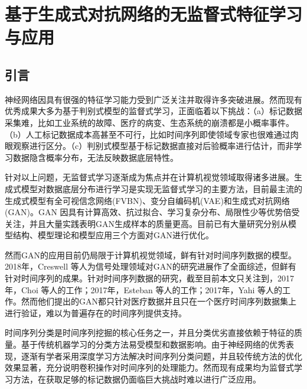 
\chapter{基于生成式对抗网络的无监督式特征学习与应用}
\label{chap:gan}

\section{引言}

神经网络因具有很强的特征学习能力受到广泛关注并取得许多突破进展\cite{lecun2015deep,tsui2015prognostics}。然而现有优秀成果大多为基于判别式模型的监督式学习，正面临着以下挑战：（a）标记数据采集难，比如工业系统的故障、医疗的病变、生态系统的崩溃都是小概率事件。（b）人工标记数据成本高甚至不可行，比如时间序列即使领域专家也很难通过肉眼观察进行区分\cite{langkvist2014review}。（c）判别式模型基于标记数据直接对后验概率进行估计，而非学习数据隐含概率分布，无法反映数据底层特性。

针对以上问题，无监督式学习逐渐成为焦点并在计算机视觉领域取得诸多进展\cite{lee2009convolutional,lecun2015deep,radford2015unsupervised}。生成式模型对数据底层分布进行学习是实现无监督式学习的主要方法，目前最主流的生成式模型有全可视信念网络(FVBN)\cite{frey1998graphical}、变分自编码机(VAE)\cite{russakovsky2015imagenet}和生成式对抗网络(GAN)\cite{goodfellow2014generative}。GAN 因具有计算高效、抗过拟合、学习复杂分布、局限性少等优势倍受关注，并且大量实践表明GAN生成样本的质量更高。目前已有大量研究分别从模型结构\cite{mirza2014conditional,denton2015deep,radford2015unsupervised}、模型理论\cite{chen2016infogan,arjovsky2017wasserstein}和模型应用\cite{isola2017image,ledig2016photo,reed2016generative,salimans2016improved}三个方面对GAN进行优化。

然而GAN的应用目前仍局限于计算机视觉领域，鲜有针对时间序列数据的模型。2018年，Creswell 等人为信号处理领域对GAN的研究进展作了全面综述，但鲜有针对时间序列的成果\cite{creswell2018generative}。针对时间序列数据的研究，截至目前本文只关注到，2017年，Choi 等人的工作\cite{choi2017generating}；2017年，Esteban 等人的工作\cite{esteban2017real}；2017年，Yahi 等人的工作\cite{yahi2017generative}。然而他们提出的GAN都只针对医疗数据并且只在一个医疗时间序列数据集上进行验证，难以为普遍存在的时间序列提供支持。

时间序列分类是时间序列挖掘的核心任务之一，并且分类优劣直接依赖于特征的质量。基于传统机器学习的分类方法易受模型和数据影响\cite{bagnall2017great}。由于神经网络的优秀表现，逐渐有学者采用深度学习方法解决时间序列分类问题，并且较传统方法的优化效果显著\cite{cui2016multi,wang2017time}，充分说明卷积操作对时间序列的处理能力。然而现有成果均为监督式学习方法，在获取足够的标记数据仍面临巨大挑战时难以进行广泛应用。

